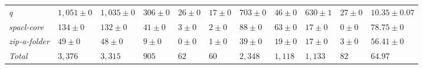 \begin{table}
{\begin{tabular}[t]{lllllllllll}
\textit{q} & $1,051 \pm 0$ & $1,035 \pm 0$ & $306 \pm 0$ & $26 \pm 0$ & $17 \pm 0$ & $703 \pm 0$ & $46 \pm 0$ & $630 \pm 1$ & $27 \pm 0$ & $10.35 \pm 0.07$\\
\textit{spacl-core} & $134 \pm 0$ & $132 \pm 0$ & $41 \pm 0$ & $3 \pm 0$ & $2 \pm 0$ & $88 \pm 0$ & $63 \pm 0$ & $17 \pm 0$ & $0 \pm 0$ & $78.75 \pm 0$\\
\textit{zip-a-folder} & $49 \pm 0$ & $48 \pm 0$ & $9 \pm 0$ & $0 \pm 0$ & $1 \pm 0$ & $39 \pm 0$ & $19 \pm 0$ & $17 \pm 0$ & $3 \pm 0$ & $56.41 \pm 0$\\
\hline\textit{Total} & $3,376$ & $3,315$ & $905$ & $62$ & $60$ & $2,348$ & $1,118$ & $1,133$ & $82$ & $64.97$\\
\bottomrule
\end{tabular}}
\end{table}
